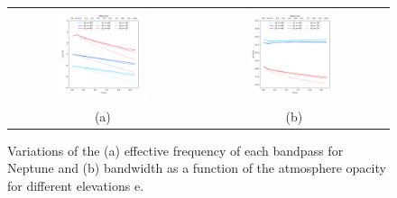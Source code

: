 \begin{figure}[ht!] %
\begin{center}
\begin{tabular}{cc}
\includegraphics[clip,trim={0, 1cm, 0,
  2cm},width=0.5\textwidth]{Figures/SpectralBands/nika2_centfreq.png}
& \includegraphics[clip,trim={0, 1cm, 0,
  2cm},width=0.5\textwidth]{Figures/SpectralBands/nika2_bandwidths.png}\\
(a) & (b) \\
\end{tabular}
\caption[Atmosphere effect on system transmission]{Variations of the
  (a) effective frequency of each bandpass for Neptune and (b)
  bandwidth as a function of the atmosphere opacity for different
  elevations e. } 
 \label{fig:atmosphereimpact}
\end{center}
\end{figure}

 



